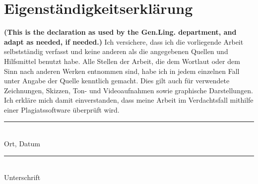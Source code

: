 \documentclass{article}
\begin{document}
\section*{Eigenständigkeitserklärung}
\textbf{(This is the declaration as used by the Gen.Ling. department, and adapt as needed, if needed.)}
Ich versichere, dass ich die vorliegende Arbeit selbstständig verfasst und keine
anderen als die angegebenen Quellen und Hilfsmittel benutzt habe. Alle Stellen
der Arbeit, die dem Wortlaut oder dem Sinn nach anderen Werken entnommen
sind, habe ich in jedem einzelnen Fall unter Angabe der Quelle kenntlich
gemacht. Dies gilt auch für verwendete Zeichnungen, Skizzen, Ton- und
Videoaufnahmen sowie graphische Darstellungen. Ich erkläre mich damit
einverstanden, dass meine Arbeit im Verdachtsfall mithilfe einer
Plagiatssoftware überprüft wird.

\vspace{2\baselineskip}

\noindent\parbox{.45\textwidth}{\rule{.4\textwidth}{1pt}\\
Ort, Datum}
\hfill
\hfill \parbox{.45\textwidth}{\rule{.4\textwidth}{1pt}\\ Unterschrift}
\end{document}
